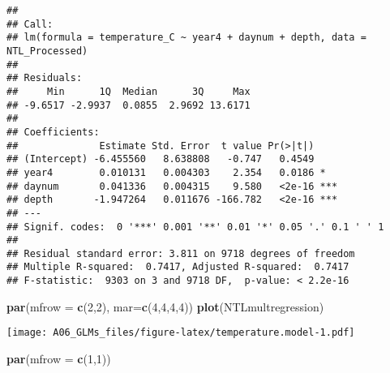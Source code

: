 \documentclass[
]{article}
\newenvironment{Shaded}{\begin{snugshade}}{\end{snugshade}}
\newcommand{\CommentTok}[1]{\textcolor[rgb]{0.56,0.35,0.01}{\textit{#1}}}
\newcommand{\DataTypeTok}[1]{\textcolor[rgb]{0.13,0.29,0.53}{#1}}
\newcommand{\DecValTok}[1]{\textcolor[rgb]{0.00,0.00,0.81}{#1}}
\newcommand{\KeywordTok}[1]{\textcolor[rgb]{0.13,0.29,0.53}{\textbf{#1}}}
\newcommand{\NormalTok}[1]{#1}
\newcommand{\OperatorTok}[1]{\textcolor[rgb]{0.81,0.36,0.00}{\textbf{#1}}}
\newcommand{\StringTok}[1]{\textcolor[rgb]{0.31,0.60,0.02}{#1}}
\begin{document}
\begin{Shaded}
\end{Shaded}

\begin{verbatim}
## 
## Call:
## lm(formula = temperature_C ~ year4 + daynum + depth, data = NTL_Processed)
## 
## Residuals:
##     Min      1Q  Median      3Q     Max 
## -9.6517 -2.9937  0.0855  2.9692 13.6171 
## 
## Coefficients:
##              Estimate Std. Error  t value Pr(>|t|)    
## (Intercept) -6.455560   8.638808   -0.747   0.4549    
## year4        0.010131   0.004303    2.354   0.0186 *  
## daynum       0.041336   0.004315    9.580   <2e-16 ***
## depth       -1.947264   0.011676 -166.782   <2e-16 ***
## ---
## Signif. codes:  0 '***' 0.001 '**' 0.01 '*' 0.05 '.' 0.1 ' ' 1
## 
## Residual standard error: 3.811 on 9718 degrees of freedom
## Multiple R-squared:  0.7417, Adjusted R-squared:  0.7417 
## F-statistic:  9303 on 3 and 9718 DF,  p-value: < 2.2e-16
\end{verbatim}

\begin{Shaded}
\begin{Highlighting}[]
\KeywordTok{par}\NormalTok{(}\DataTypeTok{mfrow =} \KeywordTok{c}\NormalTok{(}\DecValTok{2}\NormalTok{,}\DecValTok{2}\NormalTok{), }\DataTypeTok{mar=}\KeywordTok{c}\NormalTok{(}\DecValTok{4}\NormalTok{,}\DecValTok{4}\NormalTok{,}\DecValTok{4}\NormalTok{,}\DecValTok{4}\NormalTok{))}
\KeywordTok{plot}\NormalTok{(NTLmultregression)}
\end{Highlighting}
\end{Shaded}

\texttt{[image: A06\_GLMs\_files/figure-latex/temperature.model-1.pdf]}

\begin{Shaded}
\begin{Highlighting}[]
\KeywordTok{par}\NormalTok{(}\DataTypeTok{mfrow =} \KeywordTok{c}\NormalTok{(}\DecValTok{1}\NormalTok{,}\DecValTok{1}\NormalTok{))}
\end{Highlighting}
\end{Shaded}
\end{document}
